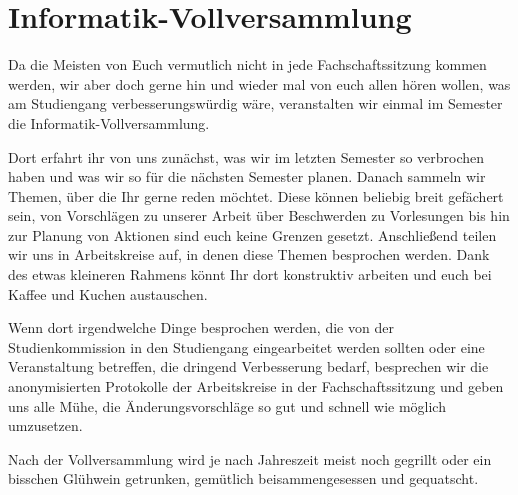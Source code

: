 \section{Informatik-Vollversammlung}

Da die Meisten von Euch vermutlich nicht in jede Fachschaftssitzung kommen werden, wir aber doch gerne hin und wieder mal von euch allen hören wollen, was am Studiengang verbesserungswürdig wäre, veranstalten wir einmal im Semester die Informatik-Vollversammlung.

Dort erfahrt ihr von uns zunächst, was wir im letzten Semester so verbrochen haben und was wir so für die nächsten Semester planen. Danach sammeln wir Themen, über die Ihr gerne reden möchtet. Diese können beliebig breit gefächert sein, von Vorschlägen zu unserer Arbeit über Beschwerden zu Vorlesungen bis hin zur Planung von Aktionen sind euch keine Grenzen gesetzt. Anschließend teilen wir uns in Arbeitskreise auf, in denen diese Themen besprochen werden. Dank des etwas kleineren Rahmens könnt Ihr dort konstruktiv arbeiten und euch bei Kaffee und Kuchen austauschen.

Wenn dort irgendwelche Dinge besprochen werden, die von der Studienkommission in den Studiengang eingearbeitet werden sollten oder eine Veranstaltung betreffen, die dringend Verbesserung bedarf, besprechen wir die anonymisierten Protokolle der Arbeitskreise in der Fachschaftssitzung und geben uns alle Mühe, die Änderungsvorschläge so gut und schnell wie möglich umzusetzen.

Nach der Vollversammlung wird je nach Jahreszeit meist noch gegrillt oder ein bisschen Glühwein getrunken, gemütlich beisammengesessen und gequatscht.

